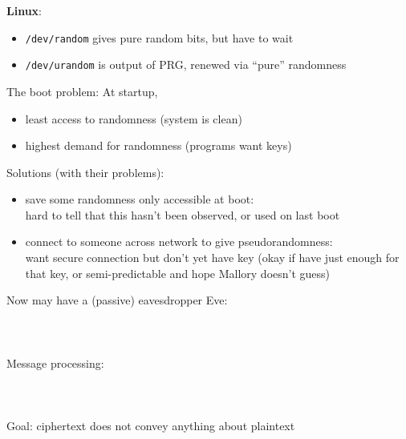 {\bf Linux}:
\begin{itemize}
    \item {\tt /dev/random} gives pure random bits, but have to wait
    \item {\tt /dev/urandom} is output of PRG, renewed via ``pure'' randomness
\end{itemize}

The boot problem: At startup,
\begin{itemize}
    \item least access to randomness (system is clean)
    \item highest demand for randomness (programs want keys)
\end{itemize}

Solutions (with their problems):
\begin{itemize}
    \item save some randomness only accessible at boot:\\
        hard to tell that this hasn't been observed, or used on last boot
    \item connect to someone across network to give pseudorandomness:\\
        want secure connection but don't yet have key (okay if have just enough
        for that key, or semi-predictable and hope Mallory doesn't guess)
\end{itemize}

Now may have a (passive) eavesdropper Eve:\\
\\
\makebox[5cm]{$\downarrow$}\\
\\

Message processing:\\
    \\
\makebox[1.5cm]{}\makebox[2.5cm]{$\uparrow$}
    \makebox[1.5cm]{}\makebox[2.5cm]{$\uparrow$}\\
\makebox[1.5cm]{}
    \makebox[1.5cm]{}\\

Goal: ciphertext does not convey anything about plaintext

